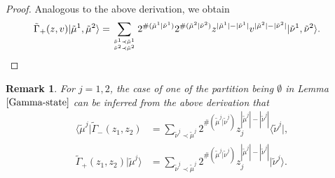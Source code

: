 \documentclass[11pt,reqno]{amsart}
\numberwithin{equation}{section}
\newtheorem{remark}[theorem]{Remark}
\begin{document}
\begin{proof}
		
		
		Analogous to the above derivation, we obtain
		\begin{align}
			\tilde{\Gamma}_+(z,v)|\tilde{\mu}^1,\tilde{\mu}^2 \rangle &= 	
			\sum_{{\tilde{\nu}^1 \prec \tilde{\mu}^1}	\atop{\tilde{\nu}^2 \prec \tilde{\mu}^2}}
			2^{\#(\tilde{\mu}^1|\tilde{\nu}^1) }2^{\#(\tilde{\mu}^2|\tilde{\nu}^2) }
			z^{|\tilde{\mu}^1| - |\tilde{\nu}^1|}    v^{|\tilde{\mu}^2| - |\tilde{\nu}^2|}         |\tilde{\nu}^1,\tilde{\nu}^2 \rangle.
		\end{align}
	\end{proof}
	\begin{remark}\label{Gamma+mu1,mu1-Gamma}
		For $j=1,2$, the case of  one of the partition being $\emptyset$ in Lemma $\ref{Gamma-state}$ can be inferred from the above derivation that
		\begin{align}
			\langle \tilde{\mu}^j|\tilde{\Gamma}_-(z_1,z_2) &=
			\sum_{\tilde{\nu}^j \prec \tilde{\mu}^j}
			2^{\#(\tilde{\mu}^j|\tilde{\nu}^j) } z_{j}^{|\tilde{\mu}^j| - |\tilde{\nu}^j|}    \langle \tilde{\nu}^j|,\\
			\tilde{\Gamma}_+(z_1,z_2)|\tilde{\mu}^j \rangle &=
			\sum_{\tilde{\nu}^j \prec \tilde{\mu}^j}
			2^{\#(\tilde{\mu}^j|\tilde{\nu}^j) } z_{j}^{|\tilde{\mu}^j| - |\tilde{\nu}^j|}           |\tilde{\nu}^j \rangle	.
		\end{align}
		
	\end{remark}
	
	
	
	
\end{document}
